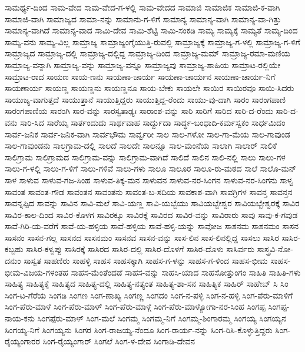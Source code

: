ಸಾಮರ್ಥ್ಯ-ದಿಂದ
ಸಾಮ-ವೇದ
ಸಾಮ-ವೇದ-ಗ-ಳಲ್ಲಿ
ಸಾಮ-ವೇದದ
ಸಾಮಾಜಿ
ಸಾಮಾಜಿಕ
ಸಾಮಾಜಿ-ಕ-ವಾಗಿ
ಸಾಮಾಜಿ-ವಾಗಿ
ಸಾಮಾಜ್ಯದ
ಸಾಮಾ-ನನ್ನು
ಸಾಮಾನು-ಗ-ಳಿಗೆ
ಸಾಮಾನ್ಯ
ಸಾಮಾನ್ಯ-ವಾಗಿ
ಸಾಮಾನ್ಯ-ವಾ-ಗಿತ್ತು
ಸಾಮಾನ್ಯ-ವಾಗಿದೆ
ಸಾಮಾನ್ಯ-ವಾದ
ಸಾಮಿ-ದೇವ
ಸಾಮಿ-ಶೆಟ್ಟಿ
ಸಾಮಿ-ಸಂಕಡಿ
ಸಾಮ್ಯ
ಸಾಮ್ಯಕ್ಕೆ
ಸಾಮ್ಯತೆ
ಸಾಮ್ಯ-ದಿಂದ
ಸಾಮ್ಯ-ವನು
ಸಾಮ್ಯ-ವಿಲ್ಲ
ಸಾಮ್ರಾಜ್ಯ
ಸಾಮ್ರಾಜ್ಯಂಗೈಯುತ್ತಿ-ರುವಲ್ಲಿ
ಸಾಮ್ರಾಜ್ಯಕ್ಕೆ
ಸಾಮ್ರಾಜ್ಯ-ಗ-ಳಲ್ಲಿ
ಸಾಮ್ರಾಜ್ಯ-ಗ-ಳಿಗೆ
ಸಾಮ್ರಾಜ್ಯದ
ಸಾಮ್ರಾಜ್ಯ-ದಲ್ಲಿ
ಸಾಮ್ರಾಜ್ಯ-ದಲ್ಲಿದ್ದ
ಸಾಮ್ರಾಜ್ಯ-ದಿಂದ
ಸಾಮ್ರಾಜ್ಯ-ಮಮ್
ಸಾಮ್ರಾಜ್ಯ-ರಮಾ-ಮಣಿಯ
ಸಾಮ್ರಾಜ್ಯ-ವನ್ನಾಗಿ
ಸಾಮ್ರಾಜ್ಯ-ವನ್ನು
ಸಾಮ್ರಾಜ್ಯ-ವನ್ನೂ
ಸಾಮ್ರಾಜ್ಯವು
ಸಾಮ್ರಾಜ್ಯ-ಶಾಹಿಯ
ಸಾಮ್ರಾಟ-ರಲ್ಲಿಯೇ
ಸಾಮ್ರಾಟ-ರಾದ
ಸಾಯಣ
ಸಾಯ-ಣನು
ಸಾಯಣಾ-ಚಾರ್ಯ
ಸಾಯಣಾ-ಚಾರ್ಯನ
ಸಾಯಣಾ-ಚಾರ್ಯ-ನಿಗೆ
ಸಾಯಣಾರ್ಯ
ಸಾಯಣ್ಣ
ಸಾಯಣ್ಣನು
ಸಾಯಣ್ಣನೂ
ಸಾಯ-ಬೇಕು
ಸಾಯಲೇ
ಸಾಯಿರ
ಸಾಯಿರವೂ
ಸಾಯಿ-ಸಿದರು
ಸಾಯುಜ್ಯ-ವಾಗುತ್ತದೆ
ಸಾಯುತ್ತಾನೆ
ಸಾಯುತ್ತಿದ್ದರು
ಸಾಯುತ್ತಿದ್ದ-ರೆಂದು
ಸಾಯು-ವು-ದಾಗಿ
ಸಾರಂ
ಸಾರಂಗಪಾಣಿ
ಸಾರಂಗಪಾಣಿಯ
ಸಾರಂಗಿ
ಸಾರ-ವನ್ನು
ಸಾರಸ್ವತಾಢ್ಯಃ
ಸಾರಾಂಶ-ವನ್ನು
ಸಾರಿ
ಸಾರಿಗೆ
ಸಾರಿದ
ಸಾರಿ-ದ-ರೆಂದು
ಸಾರಿ-ದ-ವನು
ಸಾರಿ-ಸಿದ
ಸಾರೆಯ್ಕ
ಸಾರ್ತಂದುದು
ಸಾರ್ಥವಾಹ
ಸಾರ್ದ್ದುದಾ
ಸಾರ್ದ್ಧ-ಬಂಧಾದಿ-ಕರ್ಮಸ್ವಕಂ
ಸಾರ್ಧಮಿದಂ
ಸಾರ್ವ-ಜನಿಕ
ಸಾರ್ವ-ಜನಿಕ-ವಾಗಿ
ಸಾರ್ವಭೌಮ
ಸಾರ್ವ್ವರೀ
ಸಾಲ
ಸಾಲ-ಗಳೋ
ಸಾಲ-ಗಾ-ಮೆಯ
ಸಾಲ-ಗಾವುಂಡ
ಸಾಲ-ಗಾವುಂಡನು
ಸಾಲಗ್ರಾಮ-ದಲ್ಲಿ
ಸಾಲದೆ
ಸಾಲದೇ
ಸಾಲನ್ನೂ
ಸಾಲ-ಮಂನೆಯ
ಸಾಲಾಗಿ
ಸಾಲಾರ್
ಸಾಲಿಕೆ
ಸಾಲಿಗ್ರಾಮ
ಸಾಲಿಗ್ರಾಮದ
ಸಾಲಿಗ್ರಾಮ-ವನ್ನು
ಸಾಲಿಗ್ರಾಮ-ವಾಗಿದೆ
ಸಾಲಿದೆ
ಸಾಲಿನ
ಸಾಲಿ-ನಲ್ಲಿ
ಸಾಲು
ಸಾಲು-ಗಳ
ಸಾಲು-ಗ-ಳಲ್ಲಿ
ಸಾಲು-ಗ-ಳಿಗೆ
ಸಾಲು-ಗಳಿವೆ
ಸಾಲು-ಗಳು
ಸಾಲೂ
ಸಾಲೂರ
ಸಾಲೂ-ರು-ಮಠದ
ಸಾಲೆ
ಸಾಲೊ-ಮನ್
ಸಾಳ
ಸಾಳುವ
ಸಾಳುವ-ಗಜ-ಸಿಂಹ
ಸಾಳುವ-ತಿಕ್ಕ-ಮನ
ಸಾಳುವನ
ಸಾಳುವ-ನರ-ಸಿಂಗನ
ಸಾಳುವ-ನರ-ಸಿಂಗನು
ಸಾಳ್ವ
ಸಾವಂತ
ಸಾವಂತ-ಗೌಡ
ಸಾವಂತನ
ಸಾವಂತನು
ಸಾವಂತ-ಬ-ಸದಿಯ
ಸಾವಕಾಶ-ವಾಗಿ
ಸಾವಗ್ರಿಗಳ
ಸಾವನ್ತ
ಸಾವನ್ತನ
ಸಾವನ್ನಪ್ಪಿದ
ಸಾವನ್ನು
ಸಾವಿನ
ಸಾವಿ-ಮಲೆ
ಸಾವಿ-ಯಣ್ಣ
ಸಾವಿ-ಯಬ್ಬೆಯು
ಸಾವಿಯಬ್ಬೇಶ್ವರ
ಸಾವಿಯಬ್ಬೇಶ್ವರಕ್ಕೆ
ಸಾವಿರ
ಸಾವಿರ-ಕಾಲ-ದಿಂದ
ಸಾವಿರ-ಕೊಳಗ
ಸಾವಿರಕ್ಕೂ
ಸಾವಿರಕ್ಕೆ
ಸಾವಿರದ
ಸಾವಿರ-ವನ್ನು
ಸಾವಿರಾರು
ಸಾವು
ಸಾವು-ಕ-ಗವುಡ
ಸಾವೆ-ಗಿರಿ-ಯ-ವರೆಗೆ
ಸಾವೆ-ಯ-ಹಳ್ಳಿಯ
ಸಾವೆ-ಹಳ್ಳಿಯ
ಸಾವೆ-ಹಳ್ಳಿ-ಯನ್ನು
ಸಾವೋಜ
ಸಾಶನಮ
ಸಾಶನಮಂ
ಸಾಸನ
ಸಾಸನಂ
ಸಾಸನ-ಗಲ್ಲ
ಸಾಸನದ
ಸಾಸನಮಂ
ಸಾಸನವ
ಸಾಸನ-ವನ್ನು
ಸಾಸ-ಲಿನ
ಸಾಸ-ಲಿನಲ್ಲಿದ್ದ
ಸಾಸಲು
ಸಾಸಿರ
ಸಾಸಿರ-ಕಬ್ಬಹು
ಸಾಸಿರ-ಕಳ್ವಪ್ಪು
ಸಾಸಿರಕ್ಕೆ
ಸಾಸಿರದ
ಸಾಸಿರ-ದಲ್ಲಿ
ಸಾಸಿರ-ದೊಳಗೆ
ಸಾಸಿರ-ದೊಳು
ಸಾಸಿರ್ವರು
ಸಾಸ್ತ್ರವಿ-ನೋ-ದನುಂ
ಸಾಸ್ವತ
ಸಾಹಣಿರು
ಸಾಹಳ್ಳಿ
ಸಾಹಸ
ಸಾಹಸಕ್ಕಾಗಿ
ಸಾಹಸ-ಗ-ಳನ್ನು
ಸಾಹಸ-ಗ-ಳಿಂದ
ಸಾಹಸ-ಭೀಮ
ಸಾಹಸ-ಭೀಮ-ವಿಜಯ-ಗಳಂತಹ
ಸಾಹಸ-ಮೆಂತೆಂದಡೆ
ಸಾಹಸ-ವನ್ನು
ಸಾಹಸಿ-ಯಾದ
ಸಾಹಸೋತ್ತುಂಗಂ
ಸಾಹಿತಿ
ಸಾಹಿತಿ-ಗಳು
ಸಾಹಿತ್ಯ
ಸಾಹಿತ್ಯಕ್ಕೆ
ಸಾಹಿತ್ಯದ
ಸಾಹಿತ್ಯ-ದಲ್ಲಿ
ಸಾಹಿತ್ಯ-ನತ್ಯಂತ
ಸಾಹಿತ್ಯ-ಶಾ-ಸನ
ಸಾಹಿತ್ಯಿಕ
ಸಾಹಿರ್
ಸಾಹೇಬ್
ಸಿ
ಸಿಂ
ಸಿಂಗ-ಟ-ಗೆರೆಯ
ಸಿಂಗಡಿ
ಸಿಂಗಣ
ಸಿಂಗ-ಣಾಖ್ಯ
ಸಿಂಗಣ್ಣ
ಸಿಂಗದಂ
ಸಿಂಗ-ನ-ಪಳ್ಳಿ
ಸಿಂಗ-ನ-ಹಳ್ಳಿ
ಸಿಂಗ-ಪೆರು-ಮಾಳಿಗೆ
ಸಿಂಗ-ಪೆರು-ಮಾಳೆ
ಸಿಂಗ-ಪೆರು-ಮಾಳ್
ಸಿಂಗ-ಪೆರು-ಮಾಳ್ಗೆ
ಸಿಂಗ-ಪೆರು-ಮಾಳ್ಯೋಗಾ-ನರ-ಸಿಂಹ
ಸಿಂಗಪ್ಪ
ಸಿಂಗಪ್ಪ-ನಾಯ-ಕನು
ಸಿಂಗಪ್ಪೆರು-ಮಾಳ್
ಸಿಂಗ-ಮಲೆ
ಸಿಂಗಮ್ಮ
ಸಿಂಗಮ್ಮ-ನಿಗೆ
ಸಿಂಗಮ್ಮ-ಶಿಂಗಾರಮ್ಮ
ಸಿಂಗಯ್ಯ
ಸಿಂಗಯ್ಯನ
ಸಿಂಗಯ್ಯ-ನಿಗೆ
ಸಿಂಗಯ್ಯನು
ಸಿಂಗರ
ಸಿಂಗ-ರಾಜಯ್ಯ-ನೆಂದೂ
ಸಿಂಗ-ರಾರ್ಯ-ನನ್ನು
ಸಿಂಗ-ರಿಸಿ-ಕೊಳ್ಳುತ್ತಿದ್ದರು
ಸಿಂಗ-ರೈಯ್ಯಂಗಾರರ
ಸಿಂಗ-ರೈಯ್ಯಂಗಾರ್
ಸಿಂಗಲೆ
ಸಿಂಗ-ಳ-ದೇವ
ಸಿಂಗಾಡಿ-ದೇವನ
